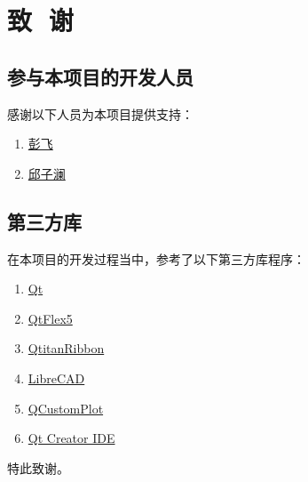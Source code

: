 \chapter{致\,\,\,\,谢}

\section{参与本项目的开发人员}

感谢以下人员为本项目提供支持：
\begin{enumerate}
	\item \href{https://github.com/Poofee}{彭飞}
	\item  \href{https://github.com/QzLancer}{邱子澜}
\end{enumerate}

\section{第三方库}

在本项目的开发过程当中，参考了以下第三方库程序：

\begin{enumerate}
	\item \href{https://www.qt.io/}{Qt}
	\item \href{https://github.com/JackyDing/QtFlex5}{QtFlex5}
	\item \href{https://www.devmachines.com/qtitanribbon-overview.html}{QtitanRibbon}
	\item \href{https://github.com/LibreCAD/LibreCAD}{LibreCAD}
	\item \href{https://www.qcustomplot.com/}{QCustomPlot}
	\item \href{https://www.qt.io/qt-features-libraries-apis-tools-and-ide/}{Qt Creator IDE}
\end{enumerate}

特此致谢。